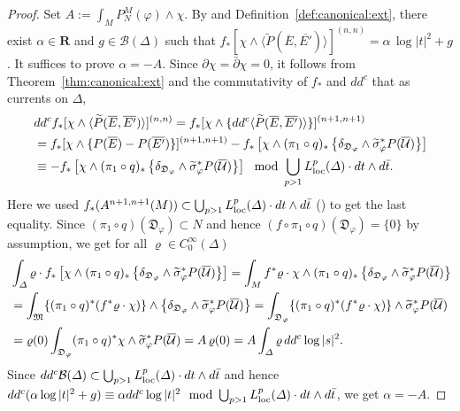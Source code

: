 \documentclass[amscd, leqno]{amsart}
\theoremstyle{plain}
\theoremstyle{definition}
\theoremstyle{remark}
\newenvironment{pf}{\begin{proof}}{\end{proof}}
\begin{document}
\begin{pf}
Set $A := \int_{M} P^{M}_{N}( \varphi )\wedge\chi$. 
By \cite[Lemma 4.4]{Yoshikawa07} and Definition~\ref{def:canonical:ext},
there exist $\alpha \in {\mathbf R}$ and $g \in {\mathcal B}(\varDelta)$ such that
$f_{*}[\chi\wedge \langle \widetilde{P}(\overline{E},\overline{E'}) \rangle]^{(n,n)} = \alpha\,\log | t |^{2} + g$. 
It suffices to prove $\alpha=-A$.
Since $\partial\chi=\bar{\partial}\chi=0$, it follows from Theorem~\ref{thm:canonical:ext} and the commutativity of $f_{*}$ and $dd^{c}$ 
that as currents on $\varDelta$,
$$
\begin{aligned}
\,&
dd^{c}f_{*}[\chi\wedge \langle \widetilde{P}(\overline{E},\overline{E'}) \rangle]^{(n,n)}
=
f_{*}[\chi\wedge\{ dd^{c} \langle\widetilde{P}(\overline{E},\overline{E'}) \rangle\}]^{(n+1,n+1)}
\\
&=
f_{*}[\chi\wedge\{ P(\overline{E}) - P(\overline{E'})\}]^{(n+1,n+1)}
-
f_{*}\left[
\chi\wedge(\pi_{1}\circ q)_{*}\left\{\delta_{{\mathfrak D}_{\varphi}}\wedge\widetilde{\sigma}_{\varphi}^{*} P(\overline{\mathcal U})\right\}
\right]
\\
&\equiv
-f_{*}\left[
\chi\wedge(\pi_{1}\circ q)_{*}\left\{\delta_{{\mathfrak D}_{\varphi}}\wedge\widetilde{\sigma}_{\varphi}^{*} P(\overline{\mathcal U})\right\}
\right]
\mod
\bigcup_{p>1} L^{p}_{\rm loc}(\varDelta)\cdot dt\wedge d\bar{t}.
\end{aligned}
$$
Here we used $f_{*}( A^{n+1,n+1}(M)) \subset \bigcup_{p>1} L_{\rm loc}^{p}(\varDelta) \cdot dt\wedge d\bar{t}$
(\cite[Lemma 9.2]{Yoshikawa07}) to get the last equality.
Since $(\pi_{1}\circ q)({\mathfrak D}_{\varphi})\subset N$ and hence $(f\circ\pi_{1}\circ q)({\mathfrak D}_{\varphi})=\{0\}$ by assumption, 
we get for all $\varrho\in C^{\infty}_{0}(\varDelta)$
$$
\begin{aligned}
\,&
\int_{\varDelta} \varrho\cdot f_{*}
\left[
\chi \wedge (\pi_{1}\circ q)_{*} \left\{ \delta_{{\mathfrak D}_{\varphi}} \wedge \widetilde{\sigma}_{\varphi}^{*} P(\overline{\mathcal U}) \right\}
\right]
=
\int_{M} f^{*}\varrho\cdot\chi\wedge(\pi_{1}\circ q)_{*} \left\{ \delta_{{\mathfrak D}_{\varphi}} \wedge \widetilde{\sigma}_{\varphi}^{*}
P(\overline{\mathcal U}) \right\}
\\
&=
\int_{\frak M} 
\{ (\pi_{1}\circ q)^{*}(f^{*}\varrho\cdot\chi)\} \wedge \left\{ \delta_{{\mathfrak D}_{\varphi}} \wedge \widetilde{\sigma}_{\varphi}^{*}
P(\overline{\mathcal U}) \right\}
=
\int_{{\mathfrak D}_{\varphi}} \{ (\pi_{1}\circ q)^{*}(f^{*}\varrho\cdot\chi) \} \wedge \widetilde{\sigma}_{\varphi}^{*}P(\overline{\mathcal U})
\\
&=
\varrho(0)\int_{{\mathfrak D}_{\varphi}} (\pi_{1}\circ q)^{*}\chi \wedge \widetilde{\sigma}_{\varphi}^{*}P(\overline{\mathcal U})
=
A\,\varrho(0)
=
A \int_{\varDelta} \varrho\, dd^{c} \log | s |^{2}.
\end{aligned}
$$
Since $dd^{c}{\mathcal B}(\varDelta) \subset \bigcup_{p>1} L^{p}_{\rm loc}(\varDelta)\cdot dt\wedge d\bar{t}$ and hence
$dd^{c}(\alpha \log |t|^{2} + g) \equiv \alpha dd^{c} \log |t|^{2} \mod \bigcup_{p>1} L^{p}_{\rm loc}(\varDelta)\cdot dt\wedge d\bar{t}$, 
we get $\alpha=-A$. 
\end{pf}
\end{document}
